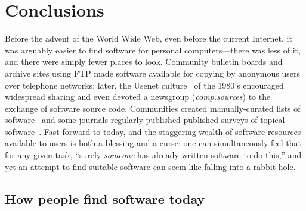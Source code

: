 \documentclass[review]{elsarticle}
\begin{document}
\section{Conclusions}
\label{conclusions}


Before the advent of the World Wide Web, even before the current Internet, it was arguably easier to find software for personal computers---there was less of it, and there were simply fewer places to look.  Community bulletin boards and archive sites using FTP made software available for copying by anonymous users over telephone networks; later, the Usenet culture~\citep{emerson1983usenet} of the 1980's encouraged widespread sharing and even devoted a newsgroup (\emph{comp.sources}) to the exchange of software source code.  Communities created manually-curated lists of software~\citep[e.g.,][]{boisvert1985gams, brand1984whole} and some journals regularly published published surveys of topical software~\citep[e.g.,][]{martinez1988software}.  Fast-forward to today, and the staggering wealth of software resources available to users is both a blessing and a curse: one can simultaneously feel that for any given task, ``surely \emph{someone} has already written software to do this,'' and yet an attempt to find suitable software can seem like falling into a rabbit hole.

\subsection{How people find software today}
\end{document}
